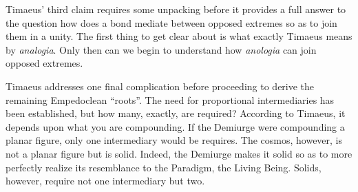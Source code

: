 Timaeus' third claim requires some unpacking before it provides a full answer to the question how does a bond mediate between opposed extremes so as to join them in a unity. The first thing to get clear about is what exactly Timaeus means by \emph{analogia}. Only then can we begin to understand how \emph{anologia} can join opposed extremes.

Timaeus addresses one final complication before proceeding to derive the remaining Empedoclean ``roots''. The need for proportional intermediaries has been established, but how many, exactly, are required? According to Timaeus, it depends upon what you are compounding. If the Demiurge were compounding a planar figure, only one intermediary would be requires. The cosmos, however, is not a planar figure but is solid. Indeed, the Demiurge makes it solid so as to more perfectly realize its resemblance to the Paradigm, the Living Being. Solids, however, require not one intermediary but two.



